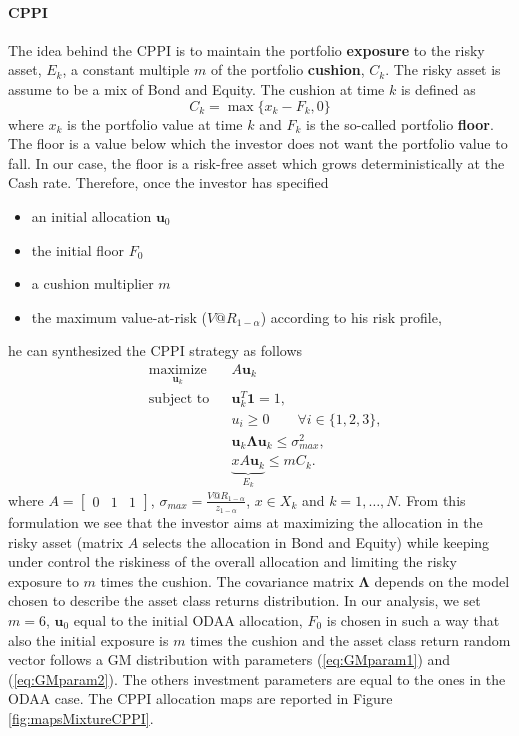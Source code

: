\paragraph{CPPI}
The idea behind the \gls{CPPI} is to maintain the portfolio \textbf{exposure} to the risky asset, $E_k$, a constant multiple $m$ of the portfolio \textbf{cushion}, $C_k$. The risky asset is assume to be a mix of Bond and Equity. The cushion at time $k$ is defined as
\[
C_k = \max\big\{x_k-F_k,0 \big\}
\]
where $x_k$ is the portfolio value at time $k$ and $F_k$ is the so-called portfolio \textbf{floor}. The floor is a value below which the investor does not want the portfolio value to fall. In our case, the floor is a risk-free asset which grows deterministically at the Cash rate. Therefore, once the investor has specified 
\begin{itemize}
	\item an initial allocation $\bm{u}_0$ 
	\item the initial floor $F_0$ 
	\item a cushion multiplier $m$
	\item the maximum value-at-risk ($V@R_{1-\alpha}$) according to his risk profile,
\end{itemize}
he can synthesized the \gls{CPPI} strategy as follows
\begin{equation*}
\begin{aligned}
& \underset{\bm{u}_k}{\text{maximize}} & &  A\bm{u}_k \\
& \text{subject to} & & \bm{u}_k^T\bm{1}=1, \\
& & & u_i \geq 0 \qquad \forall i \in \{1,2,3\},\\
& & &\bm{u}_k\bm{\Lambda}\bm{u}_k \leq \sigma_{max}^2,\\
& & & \underbrace{xA\bm{u}_k}_{E_k} \leq mC_k.
\end{aligned}
\end{equation*}
where $A=\begin{bmatrix}0 & 1 & 1\end{bmatrix}$, $\sigma_{max}=\frac{V@R_{1-\alpha}}{z_{1-\alpha}}$, $x \in X_k$ and $k = 1,\ldots,N$. From this formulation we see that the investor aims at maximizing the allocation in the risky asset (matrix $A$ selects the allocation in Bond and Equity) while keeping under control the riskiness of the overall allocation and limiting the risky exposure to $m$ times the cushion. The covariance matrix $\bm{\Lambda}$ depends on the model chosen to describe the asset class returns distribution. In our analysis, we set $m=6$, $\bm{u}_0$ equal to the initial ODAA allocation, $F_0$ is chosen in such a way that also the initial exposure is $m$ times the cushion and the asset class return random vector follows a GM distribution with parameters (\ref{eq:GMparam1}) and (\ref{eq:GMparam2}). The others investment parameters are equal to the ones in the ODAA case. The CPPI allocation maps are reported in Figure \ref{fig:mapsMixtureCPPI}.



